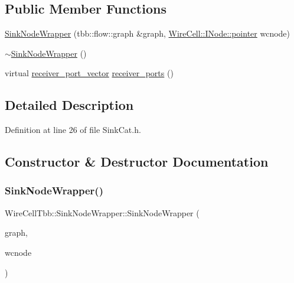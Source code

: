 \subsection*{Public Member Functions}
\begin{DoxyCompactItemize}
\item 
\hyperlink{class_wire_cell_tbb_1_1_sink_node_wrapper_a3b2d88193fda46106c9c7090be5d5a44}{Sink\+Node\+Wrapper} (tbb\+::flow\+::graph \&graph, \hyperlink{class_wire_cell_1_1_interface_a09c548fb8266cfa39afb2e74a4615c37}{Wire\+Cell\+::\+I\+Node\+::pointer} wcnode)
\item 
\hyperlink{class_wire_cell_tbb_1_1_sink_node_wrapper_aaf237869eaab7b083b7403acef321f1b}{$\sim$\+Sink\+Node\+Wrapper} ()
\item 
virtual \hyperlink{namespace_wire_cell_tbb_a87f42fe8a3ccc3bf9d315cb2d252c7af}{receiver\+\_\+port\+\_\+vector} \hyperlink{class_wire_cell_tbb_1_1_sink_node_wrapper_a09c612e3812953234b60b9e184c598cd}{receiver\+\_\+ports} ()
\end{DoxyCompactItemize}


\subsection{Detailed Description}


Definition at line 26 of file Sink\+Cat.\+h.



\subsection{Constructor \& Destructor Documentation}
\mbox{\label{class_wire_cell_tbb_1_1_sink_node_wrapper_a3b2d88193fda46106c9c7090be5d5a44}} 
\subsubsection{\texorpdfstring{Sink\+Node\+Wrapper()}{SinkNodeWrapper()}}
{\footnotesize\ttfamily Wire\+Cell\+Tbb\+::\+Sink\+Node\+Wrapper\+::\+Sink\+Node\+Wrapper (\begin{DoxyParamCaption}\item[{tbb\+::flow\+::graph \&}]{graph,  }\item[{\hyperlink{class_wire_cell_1_1_interface_a09c548fb8266cfa39afb2e74a4615c37}{Wire\+Cell\+::\+I\+Node\+::pointer}}]{wcnode }\end{DoxyParamCaption})\hspace{0.3cm}{\ttfamily [inline]}}



